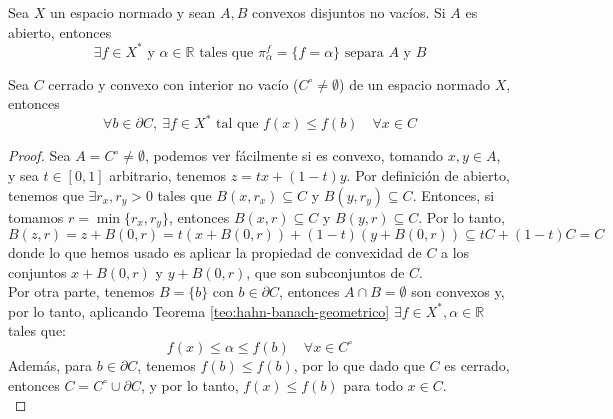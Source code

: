 \begin{teo}\label{teo:hahn-banach-geometrico}
    Sea $X$ un espacio normado y sean $A, B$ convexos disjuntos no vacíos. Si $A$ es abierto, entonces 
    \begin{equation*}
        \exists f \in X^* \text{ y } \alpha \in \mathbb{R} \text{ tales que } \pi_\alpha^f = \{ f = \alpha \} \text{ separa } A \text{ y } B
    \end{equation*}
\end{teo}

\begin{coro}
    Sea $C$ cerrado y convexo con interior no vacío ($C^\circ \neq \emptyset$) de un espacio normado $X$, entonces 
    \begin{equation*}
        \forall b \in \partial C, \ \exists f \in X^* \text{ tal que } f(x) \leq f(b) \quad \forall x \in C
    \end{equation*}

\begin{proof}
    Sea $A = C^\circ\neq \emptyset$, podemos ver fácilmente si es convexo, tomando $x,y\in A$, y sea \mbox{$t\in [0,1]$} arbitrario, tenemos $z=tx+(1-t)y$. Por definición de abierto, tenemos que $\exists r_x, r_y > 0$ tales que $B(x, r_x) \subseteq C$ y $B(y, r_y) \subseteq C$. Entonces, si tomamos $r = \min\{r_x, r_y\}$, entonces $B(x, r) \subseteq C$ y $B(y, r) \subseteq C$. Por lo tanto, 
    \begin{equation}
        B(z,r)=z+B(0,r) = t(x+B(0,r))+(1-t)(y+B(0,r)) \subseteq tC+(1-t)C = C
    \end{equation}
    donde lo que hemos usado es aplicar la propiedad de convexidad de $C$ a los conjuntos $x+B(0,r)$ y $y+B(0,r)$, que son subconjuntos de $C$. \\

    \noindent    
    Por otra parte, tenemos $B = \{b\}$ con $b \in \partial C$, entonces $A \cap B = \emptyset$ son convexos y, por lo tanto, aplicando Teorema \ref{teo:hahn-banach-geometrico} $\exists f \in X^*, \alpha \in \mathbb{R}$ tales que:
    \begin{equation*}
        f(x) \leq \alpha \leq f(b) \quad \forall x \in C^\circ
    \end{equation*}
    Además, para $b\in \partial C$, tenemos $f(b)\leq f(b)$, por lo que dado que $C$ es cerrado, entonces \mbox{$C = C^\circ \cup \partial C$}, y por lo tanto, $f(x) \leq f(b)$ para todo $x\in C$. \\
\end{proof}
\end{coro}


